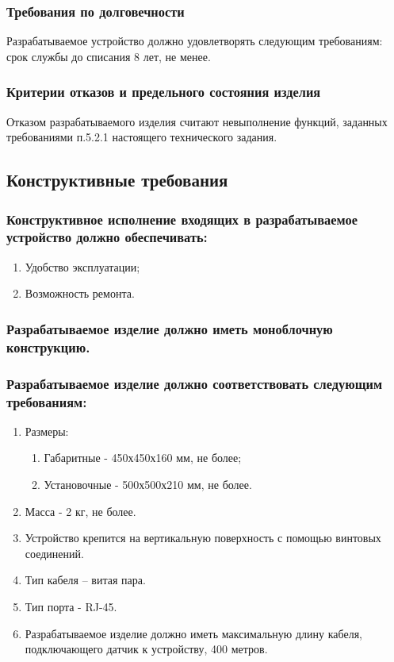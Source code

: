 			\subsubsection{Требования по долговечности}
				Разрабатываемое устройство должно удовлетворять следующим требованиям: срок службы до списания 8 лет, не менее.
			\subsubsection{Критерии отказов и предельного состояния изделия}
				Отказом разрабатываемого изделия считают невыполнение функций, заданных требованиями п.5.2.1 настоящего технического задания.
		\subsection{Конструктивные требования}
			\subsubsection{Конструктивное исполнение входящих в разрабатываемое устройство должно обеспечивать:}
				\begin{enumerate}
					\item Удобство эксплуатации;
					\item Возможность ремонта.
				\end{enumerate}
				\subsubsection{Разрабатываемое изделие должно иметь моноблочную конструкцию.}
				\subsubsection{Разрабатываемое изделие должно соответствовать следующим требованиям:}
					\begin{enumerate}
						\item Размеры:
							\begin{enumerate}
								\item Габаритные - 450х450х160 мм, не более;
								\item Установочные - 500х500х210 мм, не более.
							\end{enumerate}
						\item Масса - 2 кг, не более.
						\item Устройство крепится на вертикальную поверхность с помощью винтовых соединений.
						\item Тип кабеля – витая пара.
						\item Тип порта - RJ-45.
						\item Разрабатываемое изделие должно иметь максимальную длину кабеля, подключающего датчик к устройству, 400 метров.
					\end{enumerate}
